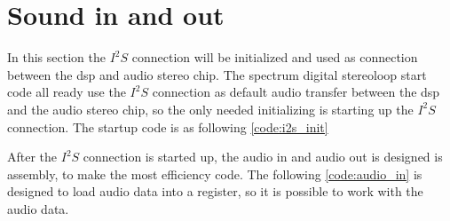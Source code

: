 
\section{Sound in and out}
In this section the $I^2S$ connection will be initialized and used as connection between the \gls{dsp} and audio stereo chip. The spectrum digital stereoloop start code all ready use the $I^2S$ connection as default audio transfer between the \gls{dsp} and the audio stereo chip, so the only needed initializing is starting up the $I^2S$ connection. The startup code is as following \autoref{code:i2s_init}


After the $I^2S$ connection is started up, the audio in and audio out is designed is assembly, to make the most efficiency code. The following \autoref{code:audio_in} is designed to load audio data into a register, so it is possible to work with the audio data. 



